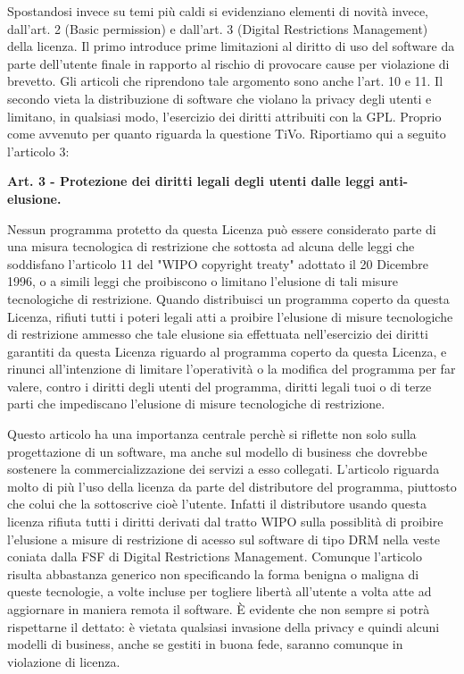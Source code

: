 Spostandosi invece su temi più caldi si evidenziano elementi di novità invece, dall’art. 2 (Basic permission) e dall’art. 3 (Digital Restrictions Management) della licenza.
Il primo introduce prime limitazioni al diritto di uso del software da parte dell’utente finale in rapporto al rischio di provocare cause per violazione di brevetto. Gli articoli che riprendono tale argomento sono anche l'art. 10 e 11.
Il secondo vieta la distribuzione di software che violano la privacy degli utenti e limitano, in qualsiasi modo, l’esercizio dei diritti attribuiti con la GPL. Proprio come avvenuto per quanto riguarda la questione TiVo.
Riportiamo qui a seguito l'articolo 3:\\


\begin{scriptsize}

\textbf{Art. 3 - Protezione dei diritti legali degli utenti dalle leggi anti-elusione.}

Nessun programma protetto da questa Licenza può essere considerato parte di una misura tecnologica di restrizione che sottosta ad alcuna delle leggi che soddisfano l'articolo 11 del "WIPO copyright treaty" adottato il 20 Dicembre 1996, o a simili leggi che proibiscono o limitano l'elusione di tali misure tecnologiche di restrizione.
Quando distribuisci un programma coperto da questa Licenza, rifiuti tutti i poteri legali atti a proibire l'elusione di misure tecnologiche di restrizione ammesso che tale elusione sia effettuata nell'esercizio dei diritti garantiti da questa Licenza riguardo al programma coperto da questa Licenza, e rinunci all'intenzione di limitare l'operatività o la modifica del programma per far valere, contro i diritti degli utenti del programma, diritti legali tuoi o di terze parti che impediscano l'elusione di misure tecnologiche di restrizione.\\
\end{scriptsize}


Questo articolo ha una importanza centrale perchè si riflette non solo sulla progettazione di un software, ma anche sul modello di business che dovrebbe sostenere la commercializzazione dei servizi a esso collegati. L'articolo riguarda molto di più l'uso della licenza da parte del distributore del programma, piuttosto che colui che la sottoscrive cioè l'utente. Infatti il distributore usando questa licenza rifiuta tutti i diritti derivati dal tratto WIPO sulla possiblità di proibire l'elusione a misure di restrizione di acesso sul software di tipo DRM nella veste coniata dalla FSF di Digital Restrictions Management. Comunque l'articolo risulta abbastanza generico non specificando la forma benigna o maligna di queste tecnologie, a volte incluse per togliere libertà all'utente a volta atte ad aggiornare in maniera remota il software. \`E evidente che non sempre si potrà rispettarne il dettato: è vietata qualsiasi invasione della privacy e quindi alcuni modelli di business, anche se gestiti in buona fede, saranno comunque in violazione di licenza.

